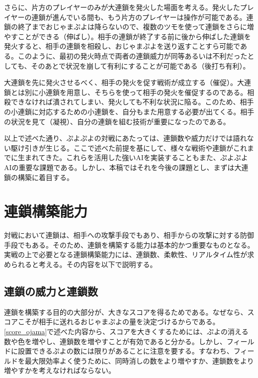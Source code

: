 \documentclass[12pt]{jarticle}
\begin{document}
さらに、片方のプレイヤーのみが大連鎖を発火した場面を考える。発火したプレイヤーの連鎖が進んでいる間も、もう片方のプレイヤーは操作が可能である。連鎖の終了までおじゃまぷよは降らないので、複数のツモを使って連鎖をさらに増やすことができる（伸ばし）。相手の連鎖が終了する前に後から伸ばした連鎖を発火すると、相手の連鎖を相殺し、おじゃまぷよを送り返すことすら可能である。このように、最初の発火時点で両者の連鎖威力が同等あるいは不利だったとしても、そのあとで状況を崩して有利にすることが可能である（後打ち有利）。

大連鎖を先に発火させるべく、相手の発火を促す戦術が成立する（催促）。大連鎖とは別に小連鎖を用意し、そちらを使って相手の発火を催促するのである。相殺できなければ潰されてしまい、発火しても不利な状況に陥る。このため、相手の小連鎖に対応するための小連鎖を、自分もまた用意する必要が出てくる。相手の状況を見て（凝視）、自分の連鎖を組む技術が重要になったのである。

以上で述べた通り、ぷよぷよの対戦にあたっては、連鎖数や威力だけでは語れない駆け引きが生じる。ここで述べた前提を基にして、様々な戦術や連鎖がこれまでに生まれてきた。これらを活用した強いAIを実装することもまた、ぷよぷよAIの重要な課題である。しかし、本稿ではそれを今後の課題とし、まずは大連鎖の構築に着目する。


\section{連鎖構築能力}
対戦において連鎖は、相手への攻撃手段でもあり、相手からの攻撃に対する防御手段でもある。そのため、連鎖を構築する能力は基本的かつ重要なものとなる。実戦の上で必要となる連鎖構築能力には、連鎖数、柔軟性、リアルタイム性が求められると考える。その内容を以下で説明する。

\subsection{連鎖の威力と連鎖数}
連鎖を構築する目的の大部分が、大きなスコアを得るためである。なぜなら、スコアこそが相手に送れるおじゃまぷよの量を決定づけるからである。\ref{score_ojama}で述べた内容から、スコアを大きくするためには、ぷよの消える数や色を増やし、連鎖数を増やすことが有効であると分かる。しかし、フィールドに設置できるぷよの数には限りがあることに注意を要する。すなわち、フィールドを最大限効率よく使うために、同時消しの数をより増やすか、連鎖数をより増やすかを考えなければならない。
\end{document}
